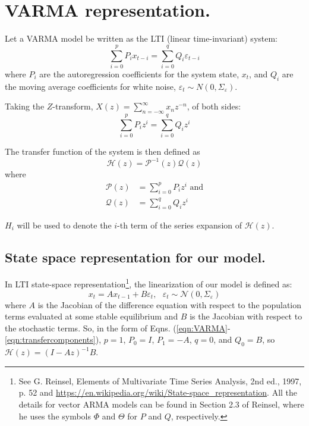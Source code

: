 \documentclass{article}
\begin{document}
\newcommand{\trans}{^{\mathsmaller T}}
\newcommand{\xx}{{xx}}

\section{VARMA representation.}

Let a VARMA model be written as the LTI (linear time-invariant) system:
\begin{equation}
\label{eqn:VARMA}
\sum_{i=0}^p P_i x_{t-i} = \sum_{i=0}^q Q_i \varepsilon_{t-i}
\end{equation}
where $P_i$ are the autoregression coefficients for the system state, $x_t$, and $Q_i$ are the moving average coefficients for white noise, $\varepsilon_t \sim N(0, \Sigma_\varepsilon)$. 

Taking the $Z$-transform, $X(z) = \sum_{n=-\infty}^{\infty}{x_n z^{-n}}$, of both sides:
\begin{equation}
\sum_{i=0}^p P_i z^i = \sum_{i=0}^q Q_i z^i
\end{equation}

The transfer function of the system is then defined as
\begin{equation}
    \mathcal{H}(z) = \mathcal{P}^{-1}(z) \mathcal{Q}(z)
    \label{eqn:transferfunction}
\end{equation}
where
\begin{align}
    \label{eqn:transfercomponents}
    \mathcal{P}(z) &= \sum_{i=0}^p P_i z^i \nonumber \text{ and} \\
    \mathcal{Q}(z) &= \sum_{i=0}^q Q_i z^i
\end{align}

$H_i$ will be used to denote the $i$-th term of the series expansion of $\mathcal{H}(z)$.

\subsection{State space representation for our model.}
In LTI state-space representation\footnote{See G. Reinsel, Elements of Multivariate Time Series Analysis, 2nd ed., 1997, p. 52 and \url{https://en.wikipedia.org/wiki/State-space_representation}. All the details for vector ARMA models can be found in Section 2.3 of Reinsel, where he uses the symbols $\Phi$ and $\Theta$ for $P$ and $Q$, respectively.}, the linearization of our model is defined as:
\begin{equation}
x_t = A x_{t-1} + B \varepsilon_{t}, ~~~\varepsilon_t \sim \mathcal{N}(0, \Sigma_\varepsilon)
\end{equation}
where $A$ is the Jacobian of the difference equation with respect to the population terms evaluated at some stable equilibrium and $B$ is the Jacobian with respect to the stochastic terms. So, in the form of Eqns. (\ref{eqn:VARMA}-\ref{eqn:transfercomponents}), $p=1$, $P_0=I$, $P_1=-A$, $q=0$, and $Q_0=B$, so $\mathcal{H}(z) = (I-Az)^{-1}B$.
\end{document}
